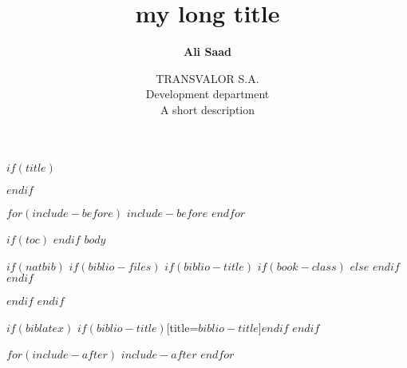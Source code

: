\documentclass [12pt]{beamer}
\title[my short title]{my long title}
\subtitle[A. Saad]
{\textbf{Ali Saad}}
\author[]{\small{
TRANSVALOR S.A. \\
Development department} \\[2\baselineskip] 
\scriptsize{A short description}}
\institute[TSV-2015]
\begin{document}
$if(title)$
\maketitle
$endif$ %

$for(include-before)$
$include-before$
$endfor$ %

$if(toc)$
{
\hypersetup{linkcolor=black}
\setcounter{tocdepth}{$toc-depth$}
\tableofcontents
}
$endif$ %
$body$

$if(natbib)$
$if(biblio-files)$
$if(biblio-title)$
$if(book-class)$
\renewcommand\bibname{$biblio-title$}
$else$
\renewcommand\refname{$biblio-title$}
$endif$ %
$endif$ %

$endif$ %
$endif$ %

$if(biblatex)$
\printbibliography$if(biblio-title)$[title=$biblio-title$]$endif$
$endif$ %

$for(include-after)$
$include-after$
$endfor$ %
\end{document}
